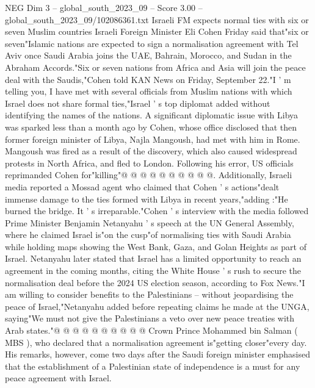 \begin{textsample}{NEG Dim 3 – global\_south\_2023\_09 – Score 3.00 – global\_south\_2023\_09/102086361.txt}  \label{ex:f3_neg_333}
Israeli FM expects normal ties with six or seven Muslim countries Israeli Foreign Minister Eli Cohen Friday said that"six or seven"Islamic nations are expected to sign a normalisation agreement with Tel Aviv once Saudi Arabia joins the UAE, Bahrain, Morocco, and Sudan in the Abraham Accords."Six or seven nations from Africa and Asia will join the peace deal with the Saudis,"Cohen told KAN News on Friday, September 22."I ' m telling you, I have met with several officials from Muslim nations with which Israel does not share formal ties,"Israel ' s top diplomat added without identifying the names of the nations.
A significant diplomatic issue with Libya was sparked less than a month ago by Cohen, whose office disclosed that then former foreign minister of Libya, Najla Mangoush, had met with him in Rome.
Mangoush was fired as a result of the discovery, which also caused widespread protests in North Africa, and fled to London.
Following his error, US officials reprimanded Cohen for"killing"@ @ @ @ @ @ @ @ @ @.
Additionally, Israeli media reported a Mossad agent who claimed that Cohen ' s actions"dealt immense damage to the ties formed with Libya in recent years,"adding :"He burned the bridge.
It ' s irreparable."Cohen ' s interview with the media followed Prime Minister Benjamin Netanyahu ' s speech at the UN General Assembly, where he claimed Israel is"on the cusp"of normalising ties with Saudi Arabia while holding maps showing the West Bank, Gaza, and Golan Heights as part of Israel.
Netanyahu later stated that Israel has a limited opportunity to reach an agreement in the coming months, citing the White House ' s rush to secure the normalisation deal before the 2024 US election season, according to Fox News."I am willing to consider benefits to the Palestinians -- without jeopardising the peace of Israel,"Netanyahu added before repeating claims he made at the UNGA, saying"We must not give the Palestinians a veto over new peace treaties with Arab states."@ @ @ @ @ @ @ @ @ @ Crown Prince Mohammed bin Salman ( MBS ), who declared that a normalisation agreement is"getting closer"every day.
His remarks, however, come two days after the Saudi foreign minister emphasised that the establishment of a Palestinian state of independence is a must for any peace agreement with Israel.

\end{textsample}
